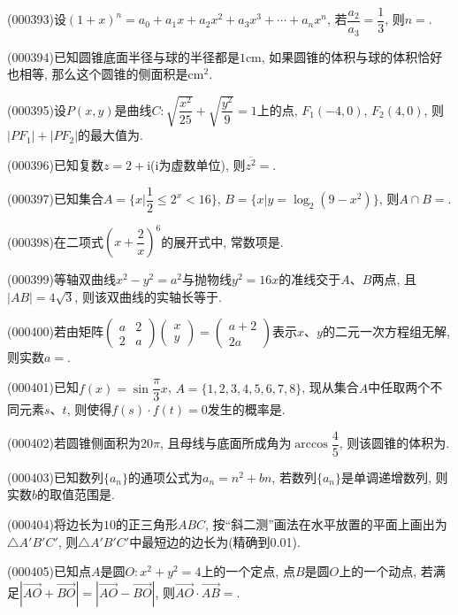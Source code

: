 \item (000393)设$(1+x)^n=a_0+a_1x+a_2x^2+a_3x^3+\cdots +a_nx^n$, 若$\dfrac{a_2}{a_3}=\dfrac13$, 则$n=$.
\item (000394)已知圆锥底面半径与球的半径都是$1\text{cm}$, 如果圆锥的体积与球的体积恰好也相等, 那么这个圆锥的侧面积是$\text{cm}^2$.
\item (000395)设$P(x,y)$是曲线$C:\sqrt{\dfrac{x^2}{25}}+\sqrt{\dfrac{y^2}9}=1$上的点, $F_1(-4,0)$, $F_2(4,0)$, 则$|PF_1|+|PF_2|$的最大值为.
\item (000396)已知复数$z=2+\mathrm{i}$($\mathrm{i}$为虚数单位), 则$\overline{{z^2}}=$.
\item (000397)已知集合$A=\{x|\dfrac12\le {2^x}<16\}$, $B=\{x|y=\log _2(9-x^2)\}$, 则$A\cap B=$.
\item (000398)在二项式$(x+\dfrac2x)^6$的展开式中, 常数项是.
\item (000399)等轴双曲线$x^2-y^2=a^2$与抛物线$y^2=16x$的准线交于$A$、$B$两点, 且$|AB|=4\sqrt3$, 则该双曲线的实轴长等于.
\item (000400)若由矩阵$\begin{pmatrix}a & 2 \\ 2 & a\end{pmatrix}\begin{pmatrix}x \\ y\end{pmatrix}=\begin{pmatrix}a+2 \\ 2a\end{pmatrix}$表示$x$、$y$的二元一次方程组无解, 则实数$a=$.
\item (000401)已知$f(x)=\sin\dfrac\pi 3x$, $A=\{1,2,3,4,5,6,7,8\}$, 现从集合$A$中任取两个不同元素$s$、$t$, 则使得$f(s)\cdot f(t)=0$发生的概率是.
\item (000402)若圆锥侧面积为$20\pi$, 且母线与底面所成角为$\arccos \dfrac45$, 则该圆锥的体积为.
\item (000403)已知数列$\{a_n\}$的通项公式为$a_n=n^2+bn$, 若数列$\{a_n\}$是单调递增数列, 则实数$b$的取值范围是.
\item (000404)将边长为$10$的正三角形$ABC$, 按``斜二测''画法在水平放置的平面上画出为$\triangle A'B'C'$, 则$\triangle A'B'C'$中最短边的边长为(精确到0.01).
\item (000405)已知点$A$是圆$O: x^2+y^2=4$上的一个定点, 点$B$是圆$O$上的一个动点, 若满足$|\overrightarrow{AO}+\overrightarrow{BO}|=|\overrightarrow{AO}-\overrightarrow{BO}|$, 则$\overrightarrow{AO}\cdot \overrightarrow{AB}=$.

